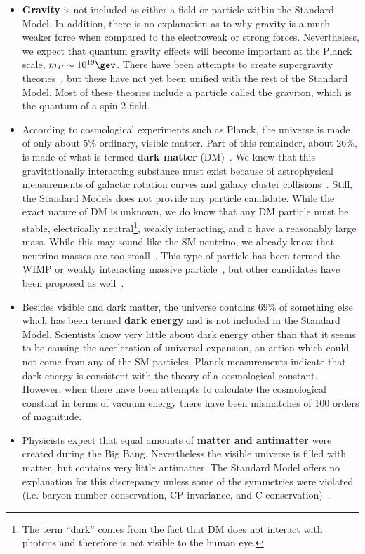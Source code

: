 \begin{itemize}
	\item \textbf{Gravity} is not included as either a field or particle within the Standard Model. In addition, there is no explanation as to why gravity is a much weaker force when compared to the electroweak or strong forces. Nevertheless, we expect that quantum gravity effects will become important at the Planck scale, $m_{P}\sim10^{19}\gev$. There have been attempts to create supergravity theories~\cite{VANNIEUWENHUIZEN1981189,Freedman2012,Nastase:2011aa}, but these have not yet been unified with the rest of the Standard Model. Most of these theories include a particle called the graviton, which is the quantum of a spin-2 field.
	\item According to cosmological experiments such as Planck, the universe is made of only about 5\% ordinary, visible matter. Part of this remainder, about 26\%, is made of what is termed \textbf{dark matter} (DM)~\cite{Ade:2015xua,Clowe:2006eq}. We know that this gravitationally interacting substance must exist because of astrophysical measurements of galactic rotation curves and galaxy cluster collisions~\cite{Morrissey20121,Garrett:2010hd}. Still, the Standard Models does not provide any particle candidate.
	While the exact nature of DM is unknown, we do know that any DM particle must be stable, electrically neutral\footnote{The term ``dark'' comes from the fact that DM does not interact with photons and therefore is not visible to the human eye.}, weakly interacting, and a have a reasonably large mass. While this may sound like the SM neutrino, we already know that neutrino masses are too small~\cite{Bertone:2004pz}. This type of particle has been termed the WIMP or weakly interacting massive particle~\cite{Morrissey20121}, but other candidates have been proposed as well~\cite{PDG}.
	\item Besides visible and dark matter, the universe contains 69\% of something else which has been termed \textbf{dark energy} and is not included in the Standard Model. Scientists know very little about dark energy other than that it seems to be causing the acceleration of universal expansion, an action which could not come from any of the SM particles. Planck measurements indicate that dark energy is consistent with the theory of a cosmological constant. However, when there have been attempts to calculate the cosmological constant in terms of vacuum energy there have been mismatches of 100 orders of magnitude. 
	\item Physicists expect that equal amounts of \textbf{matter and antimatter} were created during the Big Bang. Nevertheless the visible universe is filled with matter, but contains very little antimatter. The Standard Model offers no explanation for this discrepancy unless some of the symmetries were violated (i.e. baryon number conservation, CP invariance, and C conservation)~\cite{0038-5670-34-5-A08,KUZMIN198536}.

\end{itemize}

